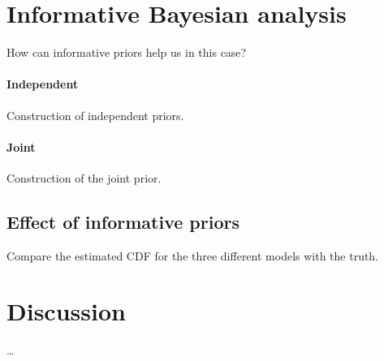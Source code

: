\section{Informative Bayesian analysis}

How can informative priors help us in this case?

\paragraph*{Independent}

Construction of independent priors.

\paragraph*{Joint}

Construction of the joint prior.

\subsection{Effect of informative priors}

Compare the estimated CDF for the three different models with the truth.

\section{Discussion}

\ldots